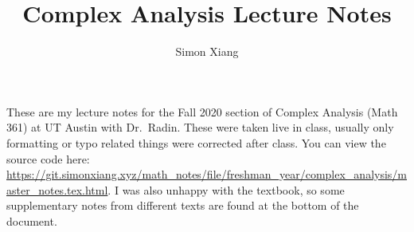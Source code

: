\documentclass[fontsize=9pt]{scrartcl}
\date{}
\author{Simon Xiang}
\title{Complex Analysis Lecture Notes}
\begin{document}
\maketitle
These are my lecture notes for the Fall 2020 section of Complex Analysis (Math 361) at UT Austin with Dr.\ Radin. These were taken live in class, usually only formatting or typo related things were corrected after class. You can view the source code here: \url{https://git.simonxiang.xyz/math_notes/file/freshman_year/complex_analysis/master_notes.tex.html}.
I was also unhappy with the textbook, so some supplementary notes from different texts are found at the bottom of the document.
\tableofcontents
    
    
    
    
    
    
    
    
    
    
    
    
    
\end{document}
